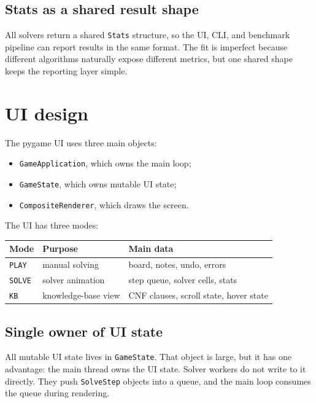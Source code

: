 \documentclass[11pt]{article}
\begin{document}
\subsection{Stats as a shared result shape}

All solvers return a shared \texttt{Stats} structure, so the UI, CLI, and
benchmark pipeline can report results in the same format. The fit is imperfect
because different algorithms naturally expose different metrics, but one shared
shape keeps the reporting layer simple.

\section{UI design}

The pygame UI uses three main objects:

\begin{itemize}
  \item \texttt{GameApplication}, which owns the main loop;
  \item \texttt{GameState}, which owns mutable UI state;
  \item \texttt{CompositeRenderer}, which draws the screen.
\end{itemize}

The UI has three modes:

\begin{table}[h]
\centering
\begin{tabular}{lll}
\toprule
Mode & Purpose & Main data \\
\midrule
\texttt{PLAY} & manual solving & board, notes, undo, errors \\
\texttt{SOLVE} & solver animation & step queue, solver cells, stats \\
\texttt{KB} & knowledge-base view & CNF clauses, scroll state, hover state \\
\bottomrule
\end{tabular}
\end{table}

\subsection{Single owner of UI state}

All mutable UI state lives in \texttt{GameState}. That object is large, but it
has one advantage: the main thread owns the UI state. Solver workers do not
write to it directly. They push \texttt{SolveStep} objects into a queue, and the
main loop consumes the queue during rendering.
\end{document}
